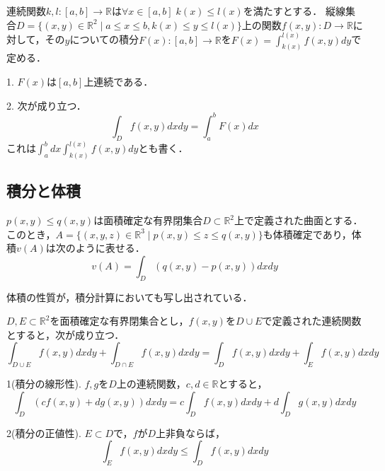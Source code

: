 \documentclass[uplatex, dvipdfmx]{jsreport}
\begin{document}
\begin{proposition}
    連続関数$k,l:[a,b]\to\mathbb{R}$は$\forall x\in [a,b]\; k(x)\le l(x)$を満たすとする．
    縦線集合$D=\{(x,y)\in\mathbb{R}^2\mid a\le x\le b, k(x)\le y\le l(x)\}$上の関数$f(x,y):D\to\mathbb{R}$に対して，その$y$についての積分$F(x):[a,b]\to\mathbb{R}$を$F(x)=\int^{l(x)}_{k(x)}f(x,y)dy$で定める．

    1. $F(x)$は$[a,b]$上連続である．

    2. 次が成り立つ．
    \[ \int_Df(x,y)dxdy = \int^b_aF(x)dx \]
    これは$\int^b_adx\int^{l(x)}_{k(x)}f(x,y)dy$とも書く．
\end{proposition}

\subsection{積分と体積}

\begin{proposition}[体積と重積分]
    $p(x,y)\le q(x,y)$は面積確定な有界閉集合$D\subset\mathbb{R}^2$上で定義された曲面とする．このとき，$A=\{(x,y,z)\in\mathbb{R}^3\mid p(x,y)\le z\le q(x,y)\}$も体積確定であり，体積$v(A)$は次のように表せる．
    \[ v(A)=\int_D(q(x,y)-p(x,y))dxdy \]
\end{proposition}

体積の性質が，積分計算においても写し出されている．
\begin{proposition}[積分の加法性]
    $D,E\subset\mathbb{R}^2$を面積確定な有界閉集合とし，$f(x,y)$を$D\cup E$で定義された連続関数とすると，次が成り立つ．
    \[ \int_{D\cup E}f(x,y)dxdy + \int_{D\cap E}f(x,y)dxdy = \int_Df(x,y)dxdy + \int_E f(x,y)dxdy \]
\end{proposition}
\begin{proposition}
    1(積分の線形性). $f,g$を$D$上の連続関数，$c,d\in\mathbb{R}$とすると，
    \[ \int_D(cf(x,y)+dg(x,y))dxdy = c\int_Df(x,y)dxdy + d\int_D g(x,y)dxdy \]

    2(積分の正値性). $E\subset D$で，$f$が$D$上非負ならば，
    \[ \int_Ef(x,y)dxdy \le \int_D f(x,y)dxdy \]
\end{proposition}

\begin{corollary}
    
\end{corollary}

\begin{proposition}
    
\end{proposition}
\end{document}
